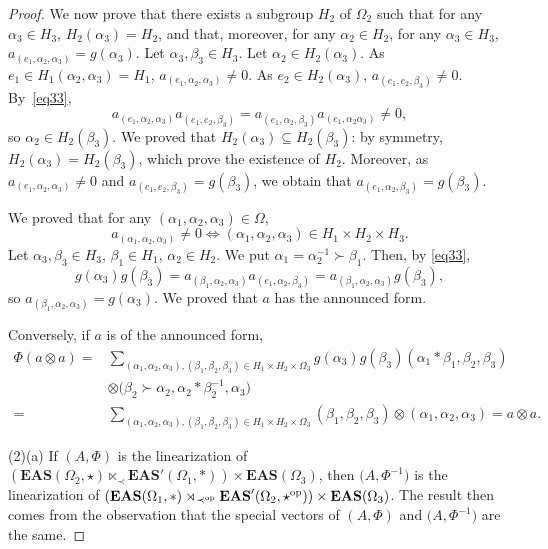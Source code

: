 \documentclass[10pt,a4paper]{amsart}
\numberwithin{equation}{section}
\newcommand{\eas}{\mathbf{EAS}}
\begin{document}
\begin{proof}
We now prove that there exists a subgroup $H_2$ of $\Omega_2$ such that for any $\alpha_3\in H_3$, $H_2(\alpha_3)=H_2$, and that, moreover, for any $\alpha_2\in H_2$, for any $\alpha_3\in H_3$, $a_{(e_1,\alpha_2,\alpha_3)}=g(\alpha_3)$.
Let $\alpha_3,\beta_3\in H_3$. Let $\alpha_2\in H_2(\alpha_3)$. As $e_1\in H_1(\alpha_2,\alpha_3)=H_1$, $a_{(e_1,\alpha_2,\alpha_3)}\neq 0$. As $e_2\in H_2(\alpha_3)$, $a_{(e_1,e_2,\beta_3)}\neq 0$. By~\eqref{eq33},
\[a_{(e_1,\alpha_2,\alpha_3)}a_{(e_1,e_2,\beta_3)}=a_{(e_1,\alpha_2,\beta_3)}a_{(e_1,\alpha_2\alpha_3)}\neq 0,\]
so $\alpha_2\in H_2(\beta_3)$. We proved that $H_2(\alpha_3)\subseteq H_2(\beta_3)$: by symmetry, $H_2(\alpha_3)=H_2(\beta_3)$, which prove the existence of $H_2$.
Moreover, as $a_{(e_1,\alpha_2,\alpha_3)}\neq 0$ and $a_{(e_1,e_2,\beta_3)}=g(\beta_3)$, we obtain that $a_{(e_1,\alpha_2,\beta_3)}=g(\beta_3)$.

We proved that for any $(\alpha_1,\alpha_2,\alpha_3)\in \Omega$,
\[a_{(\alpha_1,\alpha_2,\alpha_3)}\neq 0\Longleftrightarrow (\alpha_1,\alpha_2,\alpha_3)\in H_1\times H_2\times H_3.\]
Let $\alpha_3,\beta_3\in H_3$, $\beta_1\in H_1$, $\alpha_2\in H_2$. We put $\alpha_1=\alpha_2^{-1}\succ \beta_1$. Then, by \eqref{eq33},
\[g(\alpha_3)g(\beta_3)=a_{(\beta_1,\alpha_2,\alpha_3)}a_{(e_1,\alpha_2,\beta_3)}=a_{(\beta_1,\alpha_2,\alpha_3)}g(\beta_3),\]
so $a_{(\beta_1,\alpha_2,\alpha_3)}=g(\alpha_3)$. We proved that $a$ has the announced form.

Conversely, if $a$ is of the announced form,
\begin{align*}
\Phi(a\otimes a)={}&\sum_{(\alpha_1,\alpha_2,\alpha_3),(\beta_1,\beta_2,\beta_3)\in H_1\times H_2\times \Omega_3}g(\alpha_3)g(\beta_3)(\alpha_1*\beta_1,\beta_2,\beta_3)\\
&\otimes \bigl(\beta_2\succ \alpha_2,\alpha_2*\beta_2^{-1},\alpha_3\bigr)\\
={}&\sum_{(\alpha_1,\alpha_2,\alpha_3),(\beta_1,\beta_2,\beta_3)\in H_1\times H_2\times \Omega_3}(\beta_1,\beta_2,\beta_3)\otimes (\alpha_1,\alpha_2,\alpha_3)
=a\otimes a.
\end{align*}

(2)(a) If $(A,\Phi)$ is the linearization of $(\eas(\Omega_2,\star) \ltimes_\prec \eas'(\Omega_1,*))\times \eas(\Omega_3)$, then $\bigl(A,\Phi^{-1}\bigr)$ is the linearization of $(\eas(\Omega_1,*) \rtimes_{\prec^{\rm op}} \eas'(\Omega_2,\star^{\rm op}))\times \eas(\Omega_3)$.
The result then comes from the observation that the special vectors of $(A,\Phi)$ and $\bigl(A,\Phi^{-1}\bigr)$ are the same.


\end{proof}
\end{document}
